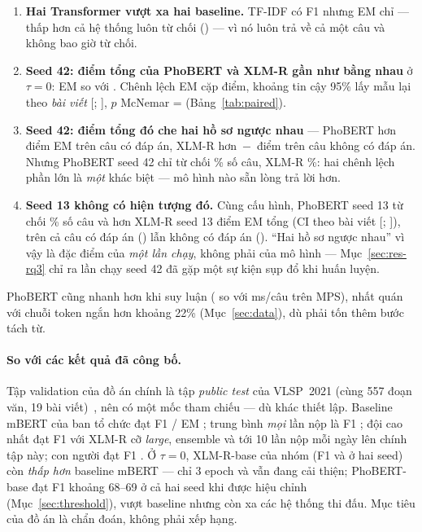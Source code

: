 \begin{enumerate}
  \item \textbf{Hai Transformer vượt xa hai baseline.} TF-IDF có F1 \TfidfFone{} nhưng EM chỉ
        \TfidfEM{} --- thấp hơn cả hệ thống luôn từ chối (\AbstainEM) --- vì nó luôn trả về cả một câu
        và không bao giờ từ chối.
  \item \textbf{Seed 42: điểm tổng của PhoBERT và XLM-R gần như bằng nhau} ở $\tau = 0$: EM \PhobertEM{} so với
        \XlmrEM. Chênh lệch EM cặp \PairDiff{} điểm, khoảng tin cậy 95\% lấy mẫu lại theo \emph{bài viết}
        [\PairArtLo; \PairArtHi], $p$ McNemar = \PairP{} (Bảng~\ref{tab:paired}).
  \item \textbf{Seed 42: điểm tổng đó che hai hồ sơ ngược nhau} --- PhoBERT hơn \PairAnsDiff{} điểm EM trên câu
        có đáp án, XLM-R hơn \,$-$\PairImpDiff{}\, điểm trên câu không có đáp án. Nhưng PhoBERT seed 42 chỉ
        từ chối \PhobertAbsRate\% số câu, XLM-R \XlmrAbsRate\%: hai chênh lệch phần lớn là \emph{một} khác biệt
        --- mô hình nào sẵn lòng trả lời hơn.
  \item \textbf{Seed 13 không có hiện tượng đó.} Cùng cấu hình, PhoBERT seed 13 từ chối \PhobertThirteenAbsRate\%
        số câu và hơn XLM-R seed 13 \PairSDiff{} điểm EM tổng (CI theo bài viết [\PairSArtLo; \PairSArtHi]),
        trên cả câu có đáp án (\PairSAnsDiff) lẫn không có đáp án (\PairSImpDiff). ``Hai hồ sơ ngược nhau''
        vì vậy là đặc điểm của \emph{một lần chạy}, không phải của mô hình --- Mục~\ref{sec:res-rq3} chỉ ra
        lần chạy seed 42 đã gặp một sự kiện sụp đổ khi huấn luyện.
\end{enumerate}

PhoBERT cũng nhanh hơn khi suy luận (\PhobertLat{} so với \XlmrLat{} ms/câu trên MPS), nhất quán với
chuỗi token ngắn hơn khoảng 22\% (Mục~\ref{sec:data}), dù phải tốn thêm bước tách từ.

\paragraph{So với các kết quả đã công bố.} Tập validation của đồ án chính là tập \emph{public test} của
VLSP~2021 (cùng 557 đoạn văn, 19 bài viết)~\cite{nguyen2022vlsp}, nên có một mốc tham chiếu --- dù khác
thiết lập. Baseline mBERT của ban tổ chức đạt F1 \PubBaseFone{} / EM \PubBaseEM; trung bình \emph{mọi} lần
nộp là F1 \PubMeanFone; đội cao nhất đạt F1 \PubBestFone{} với XLM-R cỡ \emph{large}, ensemble và tới 10 lần
nộp mỗi ngày lên chính tập này; con người đạt F1 \PubHumanFone. Ở $\tau = 0$, XLM-R-base của nhóm
(F1 \XlmrFone{} và \XlmrThirteenFone{} ở hai seed) còn \emph{thấp hơn} baseline mBERT --- chỉ 3 epoch và vẫn
đang cải thiện; PhoBERT-base đạt F1 khoảng 68--69 ở cả hai seed khi được hiệu chỉnh (Mục~\ref{sec:threshold}),
vượt baseline nhưng còn xa các hệ thống thi đấu. Mục tiêu của đồ án là chẩn đoán, không phải xếp hạng.

